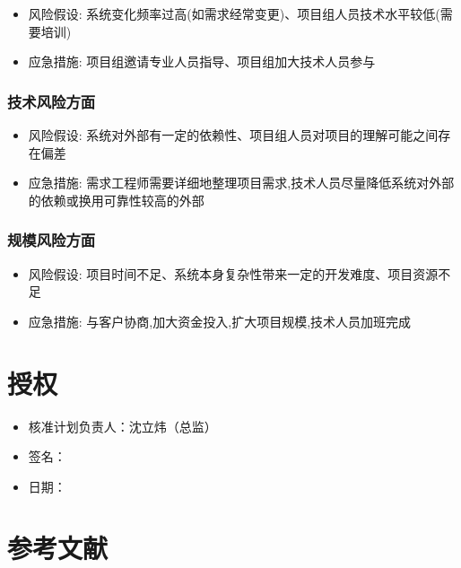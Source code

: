 \documentclass[hyperref, a4paper]{ctexart}
\providecommand{\tightlist}{%
  \setlength{\itemsep}{0pt}\setlength{\parskip}{0pt}}
\begin{document}
\begin{itemize}
\tightlist
\item
  风险假设:
  系统变化频率过高(如需求经常变更)、项目组人员技术水平较低(需要培训)
\item
  应急措施: 项目组邀请专业人员指导、项目组加大技术人员参与
\end{itemize}

\hypertarget{ux6280ux672fux98ceux9669ux65b9ux9762}{%
\subsubsection{技术风险方面}\label{ux6280ux672fux98ceux9669ux65b9ux9762}}

\begin{itemize}
\tightlist
\item
  风险假设:
  系统对外部有一定的依赖性、项目组人员对项目的理解可能之间存在偏差
\item
  应急措施:
  需求工程师需要详细地整理项目需求,技术人员尽量降低系统对外部的依赖或换用可靠性较高的外部
\end{itemize}

\hypertarget{ux89c4ux6a21ux98ceux9669ux65b9ux9762}{%
\subsubsection{规模风险方面}\label{ux89c4ux6a21ux98ceux9669ux65b9ux9762}}

\begin{itemize}
\tightlist
\item
  风险假设: 项目时间不足、系统本身复杂性带来一定的开发难度、项目资源不足
\item
  应急措施: 与客户协商,加大资金投入,扩大项目规模,技术人员加班完成
\end{itemize}

\hypertarget{ux6388ux6743}{%
\section{授权}\label{ux6388ux6743}}

\begin{itemize}
\tightlist
\item
  核准计划负责人：沈立炜（总监）
\item
  签名：
\item
  日期：
\end{itemize}

\pagebreak

\hypertarget{ux53c2ux8003ux6587ux732e}{%
\section*{参考文献}\label{ux53c2ux8003ux6587ux732e}}
\end{document}
